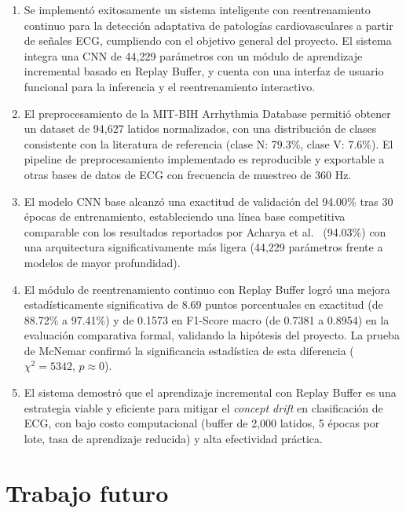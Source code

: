 \begin{enumerate}
\item Se implementó exitosamente un sistema inteligente con reentrenamiento continuo para la detección adaptativa de patologías cardiovasculares a partir de señales ECG, cumpliendo con el objetivo general del proyecto. El sistema integra una CNN de 44,229 parámetros con un módulo de aprendizaje incremental basado en Replay Buffer, y cuenta con una interfaz de usuario funcional para la inferencia y el reentrenamiento interactivo.

\item El preprocesamiento de la MIT-BIH Arrhythmia Database permitió obtener un dataset de 94,627 latidos normalizados, con una distribución de clases consistente con la literatura de referencia (clase N: 79.3\%, clase V: 7.6\%). El pipeline de preprocesamiento implementado es reproducible y exportable a otras bases de datos de ECG con frecuencia de muestreo de 360 Hz.

\item El modelo CNN base alcanzó una exactitud de validación del 94.00\% tras 30 épocas de entrenamiento, estableciendo una línea base competitiva comparable con los resultados reportados por Acharya et al.\ \cite{Acharya2017} (94.03\%) con una arquitectura significativamente más ligera (44,229 parámetros frente a modelos de mayor profundidad).

\item El módulo de reentrenamiento continuo con Replay Buffer logró una mejora estadísticamente significativa de 8.69 puntos porcentuales en exactitud (de 88.72\% a 97.41\%) y de 0.1573 en F1-Score macro (de 0.7381 a 0.8954) en la evaluación comparativa formal, validando la hipótesis del proyecto. La prueba de McNemar confirmó la significancia estadística de esta diferencia ($\chi^2 = 5342$, $p \approx 0$).

\item El sistema demostró que el aprendizaje incremental con Replay Buffer es una estrategia viable y eficiente para mitigar el \textit{concept drift} en clasificación de ECG, con bajo costo computacional (buffer de 2,000 latidos, 5 épocas por lote, tasa de aprendizaje reducida) y alta efectividad práctica.
\end{enumerate}

\section{Trabajo futuro}

